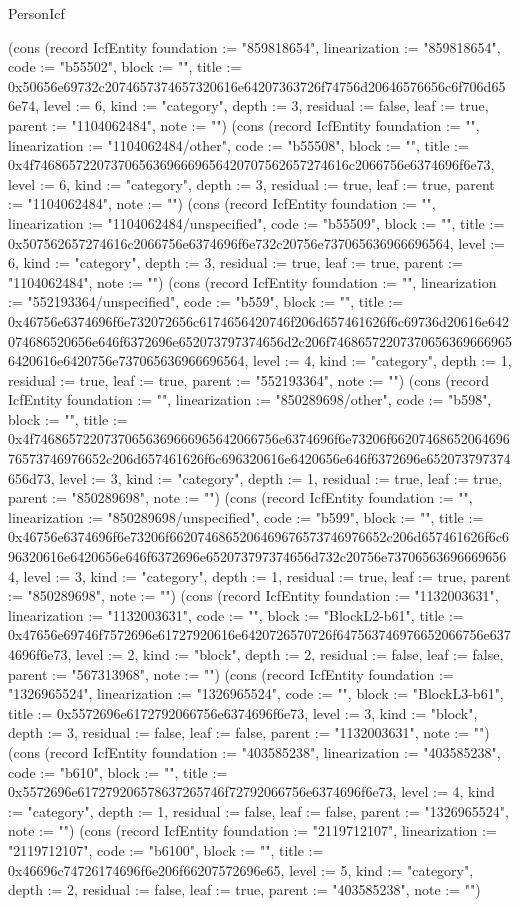 \begin{lexlean}{PersonIcf}
\begin{semanticmodule}
{(cons (record IcfEntity {foundation := "859818654", linearization := "859818654", code := "b55502", block := "", title := 0x50656e69732c2074657374657320616e64207363726f74756d20646576656c6f706d656e74, level := 6, kind := "category", depth := 3, residual := false, leaf := true, parent := "1104062484", note := ""}) (cons (record IcfEntity {foundation := "", linearization := "1104062484/other", code := "b55508", block := "", title := 0x4f746865722073706563696669656420707562657274616c2066756e6374696f6e73, level := 6, kind := "category", depth := 3, residual := true, leaf := true, parent := "1104062484", note := ""}) (cons (record IcfEntity {foundation := "", linearization := "1104062484/unspecified", code := "b55509", block := "", title := 0x507562657274616c2066756e6374696f6e732c20756e737065636966696564, level := 6, kind := "category", depth := 3, residual := true, leaf := true, parent := "1104062484", note := ""}) (cons (record IcfEntity {foundation := "", linearization := "552193364/unspecified", code := "b559", block := "", title := 0x46756e6374696f6e732072656c6174656420746f206d657461626f6c69736d20616e642074686520656e646f6372696e652073797374656d2c206f746865722073706563696669656420616e6420756e737065636966696564, level := 4, kind := "category", depth := 1, residual := true, leaf := true, parent := "552193364", note := ""}) (cons (record IcfEntity {foundation := "", linearization := "850289698/other", code := "b598", block := "", title := 0x4f74686572207370656369666965642066756e6374696f6e73206f6620746865206469676573746976652c206d657461626f6c696320616e6420656e646f6372696e652073797374656d73, level := 3, kind := "category", depth := 1, residual := true, leaf := true, parent := "850289698", note := ""}) (cons (record IcfEntity {foundation := "", linearization := "850289698/unspecified", code := "b599", block := "", title := 0x46756e6374696f6e73206f6620746865206469676573746976652c206d657461626f6c696320616e6420656e646f6372696e652073797374656d732c20756e737065636966696564, level := 3, kind := "category", depth := 1, residual := true, leaf := true, parent := "850289698", note := ""}) (cons (record IcfEntity {foundation := "1132003631", linearization := "1132003631", code := "", block := "BlockL2-b61", title := 0x47656e69746f7572696e61727920616e6420726570726f647563746976652066756e6374696f6e73, level := 2, kind := "block", depth := 2, residual := false, leaf := false, parent := "567313968", note := ""}) (cons (record IcfEntity {foundation := "1326965524", linearization := "1326965524", code := "", block := "BlockL3-b61", title := 0x5572696e6172792066756e6374696f6e73, level := 3, kind := "block", depth := 3, residual := false, leaf := false, parent := "1132003631", note := ""}) (cons (record IcfEntity {foundation := "403585238", linearization := "403585238", code := "b610", block := "", title := 0x5572696e617279206578637265746f72792066756e6374696f6e73, level := 4, kind := "category", depth := 1, residual := false, leaf := false, parent := "1326965524", note := ""}) (cons (record IcfEntity {foundation := "2119712107", linearization := "2119712107", code := "b6100", block := "", title := 0x46696c74726174696f6e206f66207572696e65, level := 5, kind := "category", depth := 2, residual := false, leaf := true, parent := "403585238", note := ""}) }
\end{semanticmodule}
\end{lexlean}
